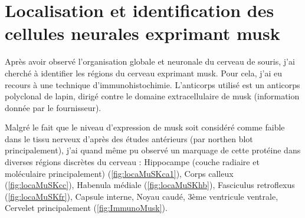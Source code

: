 \section{Localisation et identification des cellules neurales exprimant \acrshort{musk}}
	\label{ssec:musk}
	Après avoir observé l'organisation globale et neuronale du cerveau de souris, j'ai cherché à identifier les régions du cerveau exprimant \gls{musk}. Pour cela, j'ai eu recours à une technique d'immunohistochimie. L'anticorps utilisé est un anticorps polyclonal de lapin, dirigé contre le domaine extracellulaire de \gls{musk} (information donnée par le fournisseur).
	
	Malgré le fait que le niveau d'expression de \gls{musk} soit considéré comme faible dans le tissu nerveux d'après des études antérieurs (par northen blot principalement), j'ai quand même pu observé un marquage de cette protéine dans diverses régions discrètes du cerveau : Hippocampe (couche radiaire et moléculaire principalement) (\cref{fig:locaMuSKca1}), Corps calleux (\cref{fig:locaMuSKcc}), Habenula médiale (\cref{fig:locaMuSKhb}), Fasciculus retroflexus (\cref{fig:locaMuSKfr}), Capsule interne, Noyau caudé, 3ème ventricule ventrale, Cervelet principalement (\cref{fig:ImmunoMusk}). 
	
